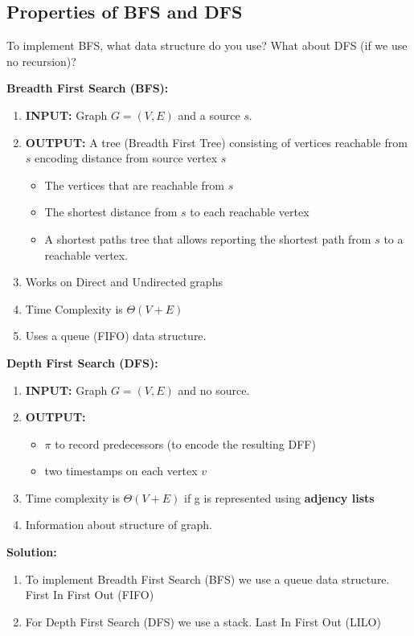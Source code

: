 \documentclass[11pt,fleqn]{book}
\begin{document}
\subsection{Properties of BFS and DFS}
\vspace{1em}
\begin{example}
To implement BFS, what data structure do you use? What about DFS (if we use no recursion)?
\end{example}
\begin{definition}
\textbf{Breadth First Search (BFS):} 
\begin{enumerate}
    \item \textbf{INPUT:} Graph $G = (V,E)$ and a source $s$. 
    \item \textbf{OUTPUT:} A tree (Breadth First Tree) consisting of vertices reachable from $s$ encoding distance from source vertex $s$
    \begin{itemize}
    \item The vertices that are reachable from $s$
    \item The shortest distance from $s$ to each reachable vertex
    \item A shortest paths tree that allows reporting the shortest path from $s$ to a reachable vertex.
    \end{itemize}
    \item Works on Direct and Undirected graphs
      \item Time Complexity is $\Theta(V + E)$
    \item Uses a queue (FIFO) data structure. 
\end{enumerate}
\end{definition}
\begin{definition}
\textbf{Depth First Search (DFS): } 
\begin{enumerate}
    \item \textbf{INPUT:} Graph $G = (V,E)$ and no source. 
    \item \textbf{OUTPUT:}
    \begin{itemize}
        \item  $\pi$ to record predecessors (to encode the resulting DFF)
        \item two timestamps on each vertex $v$
    \end{itemize}
    \item Time complexity is $\Theta(V + E)$ if g is represented using \textbf{adjency lists} 
    \item Information about structure of graph. 
\end{enumerate}
\end{definition}
\textbf{Solution: } 
\begin{enumerate}
    \item To implement Breadth First Search (BFS) we use a queue data structure. First In First Out (FIFO)
    \item For Depth First Search (DFS) we use a stack. Last In First Out (LILO)
\end{enumerate}
\end{document}
